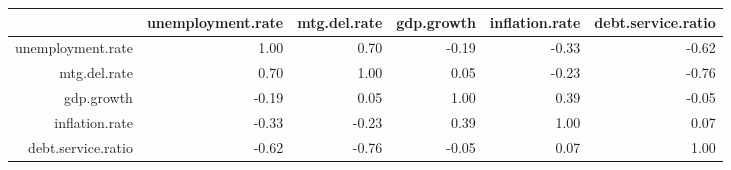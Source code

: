 \begin{table}[ht]
\centering
\begin{tabular}{rrrrrr}
  \hline
 & unemployment.rate & mtg.del.rate & gdp.growth & inflation.rate & debt.service.ratio \\ 
  \hline
unemployment.rate & 1.00 & 0.70 & -0.19 & -0.33 & -0.62 \\ 
  mtg.del.rate & 0.70 & 1.00 & 0.05 & -0.23 & -0.76 \\ 
  gdp.growth & -0.19 & 0.05 & 1.00 & 0.39 & -0.05 \\ 
  inflation.rate & -0.33 & -0.23 & 0.39 & 1.00 & 0.07 \\ 
  debt.service.ratio & -0.62 & -0.76 & -0.05 & 0.07 & 1.00 \\ 
   \hline
\end{tabular}
\end{table}
